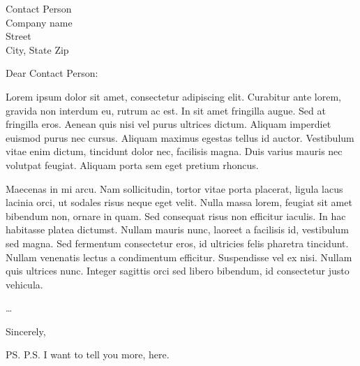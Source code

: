 \documentclass[10pt]{letter}
\begin{document}
\begin{letter}{Contact Person\\ Company name\\ Street\\ City, State Zip}

\opening{Dear Contact Person:}

Lorem ipsum dolor sit amet, consectetur adipiscing elit. Curabitur ante lorem, gravida non interdum eu, rutrum ac est. In sit amet fringilla augue. Sed at fringilla eros. Aenean quis nisi vel purus ultrices dictum. Aliquam imperdiet euismod purus nec cursus. Aliquam maximus egestas tellus id auctor. Vestibulum vitae enim dictum, tincidunt dolor nec, facilisis magna. Duis varius mauris nec volutpat feugiat. Aliquam porta sem eget pretium rhoncus.

Maecenas in mi arcu. Nam sollicitudin, tortor vitae porta placerat, ligula lacus lacinia orci, ut sodales risus neque eget velit. Nulla massa lorem, feugiat sit amet bibendum non, ornare in quam. Sed consequat risus non efficitur iaculis. In hac habitasse platea dictumst. Nullam mauris nunc, laoreet a facilisis id, vestibulum sed magna. Sed fermentum consectetur eros, id ultricies felis pharetra tincidunt. Nullam venenatis lectus a condimentum efficitur. Suspendisse vel ex nisi. Nullam quis ultrices nunc. Integer sagittis orci sed libero bibendum, id consectetur justo vehicula.

\dots

\closing{Sincerely,}

\ps{P.S. I want to tell you more, here.}

\end{letter}
\end{document}
